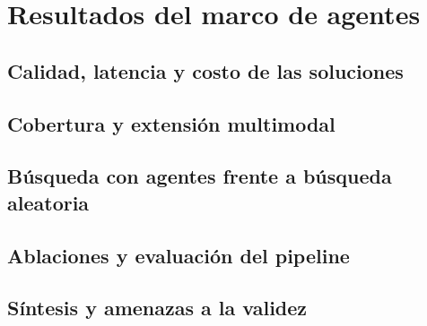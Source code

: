 \chapter{Resultados del marco de agentes}
\label{cap:resultados-marco}


\section{Calidad, latencia y costo de las soluciones}

\section{Cobertura y extensión multimodal}

\section{Búsqueda con agentes frente a búsqueda aleatoria}

\section{Ablaciones y evaluación del pipeline}

\section{Síntesis y amenazas a la validez}
